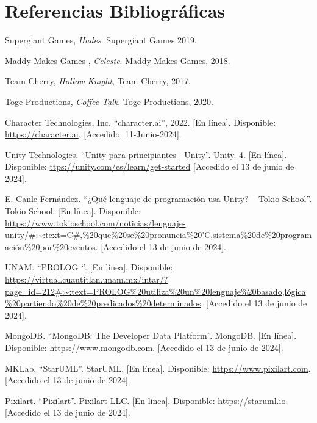 \documentclass[12pt,twoside]{article}
\begin{document}
	\clearpage
	
	\section{Referencias Bibliográficas}
	
	\begin{thebibliography}{10}
	
	Supergiant Games, \textit{Hades}. Supergiant Games 2019.
	
	Maddy Makes Games , \textit{Celeste}. Maddy Makes Games, 2018.
	
	Team Cherry, \textit{Hollow Knight}, Team Cherry, 2017.
	
	Toge Productions, \textit{Coffee Talk}, Toge Productions, 2020.
	
	Character Technologies, Inc. ``character.ai'', 2022. [En línea]. Disponible: \url{https://character.ai}.  [Accedido: 11-Junio-2024].

	Unity Technologies. ``Unity para principiantes | Unity''. Unity. 4. [En línea]. Disponible: \url{ttps://unity.com/es/learn/get-started} [Accedido el 13 de junio de 2024].

	E. Canle Fernández. ``¿Qué lenguaje de programación usa Unity? – Tokio School”. Tokio School. [En línea]. Disponible: \url{https://www.tokioschool.com/noticias/lenguaje-unity/#:~:text=C#,%20que%20se%20pronuncia%20'C,sistema%20de%20programación%20por%20eventos}. [Accedido el 13 de junio de 2024].

	UNAM. ``PROLOG `'. [En línea]. Disponible: \url{https://virtual.cuautitlan.unam.mx/intar/?page_id=212#:~:text=PROLOG%20utiliza%20un%20lenguaje%20basado,lógica%20partiendo%20de%20predicados%20determinados}. [Accedido el 13 de junio de 2024].

	MongoDB. ``MongoDB: The Developer Data Platform''. MongoDB.  [En línea]. Disponible: \url{https://www.mongodb.com}. [Accedido el 13 de junio de 2024].

	MKLab.  ``StarUML''. StarUML. [En línea]. Disponible: \url{https://www.pixilart.com}. [Accedido el 13 de junio de 2024].
	
	Pixilart.  ``Pixilart''. Pixilart LLC. [En línea]. Disponible: \url{https://staruml.io}. [Accedido el 13 de junio de 2024].

	\end{thebibliography}
	
\end{document}
